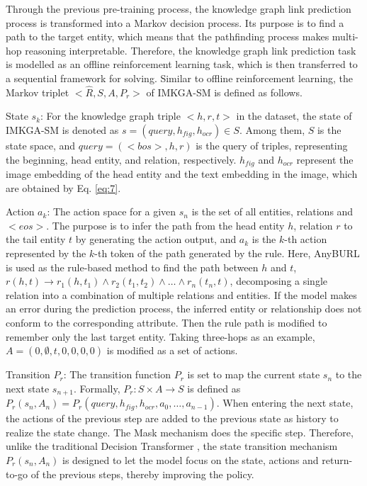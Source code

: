 \documentclass[10pt,journal,compsoc]{IEEEtran}
\begin{document}
Through the previous pre-training process, the knowledge graph link prediction process is transformed into a Markov decision process. Its purpose is to find a path to the target entity, which means that the pathfinding process makes multi-hop reasoning interpretable. Therefore, the knowledge graph link prediction task is modelled as an offline reinforcement learning task, which is then transferred to a sequential framework for solving. Similar to offline reinforcement learning, the Markov triplet $<\hat{R},S,A,P_r>$ of IMKGA-SM is defined as follows.\par
State $s_k$: For the knowledge graph triple $<h,r,t>$ in the dataset, the state of IMKGA-SM is denoted as $s=(query, h_{fig},h_{ocr}) \in S$. Among them, $S$ is the state space, and $query=(<bos>, h, r)$ is the query of triples, representing the beginning, head entity, and relation, respectively. $h_{fig}$ and $h_{ocr}$  represent the image embedding of the head entity and the text embedding in the image, which are obtained by Eq. \ref{eq:7}.\par
Action $a_k$: The action space for a given $s_n$ is the set of all entities, relations and $<eos>$. The purpose is to infer the path from the head entity $h$, relation $r$ to the tail entity $t$ by generating the action output, and $a_k$ is the $k$-th action represented by the $k$-th token of the path generated by the rule. Here, AnyBURL \cite{ref4} is used as the rule-based method to find the path between $h$ and $t$, $r\left( {h,t} \right) \to {r_1}\left( {h,{t_1}} \right) \wedge {r_2}\left( {{t_1},{t_2}} \right) \wedge  \ldots  \wedge {r_n}\left( {{t_n},t} \right)$, decomposing a single relation into a combination of multiple relations and entities. If the model makes an error during the prediction process, the inferred entity or relationship does not conform to the corresponding attribute. Then the rule path is modified to remember only the last target entity. Taking three-hops as an example, $A = \left( {0,\emptyset,t,0,0,0,0} \right)$ is modified as a set of actions.\par
Transition $P_r$: The transition function $P_r$ is set to map the current state $s_n$ to the next state $s_{n+1}$. Formally, ${P_r}:S \times A \to S$ is defined as ${P_r}\left( {{s_n},{A_n}} \right) = {P_r}\left( {query,{h_{fig}},{h_{ocr}},{a_0}, \ldots ,{a_{n - 1}}} \right)$. When entering the next state, the actions of the previous step are added to the previous state as history to realize the state change. The Mask mechanism  \uppercase\expandafter{} does the specific step. Therefore, unlike the traditional Decision Transformer \cite{ref17}, the state transition mechanism ${P_r}\left( {{s_n},{A_n}} \right)$ is designed to let the model focus on the state, actions and return-to-go of the previous steps, thereby improving the policy.\par
\end{document}
